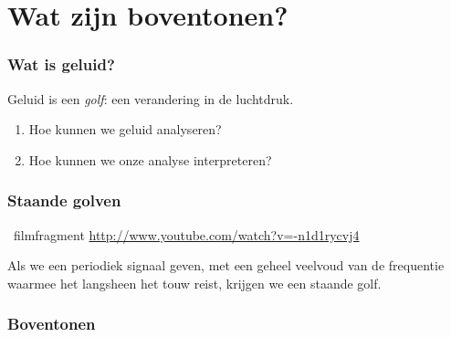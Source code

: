 \documentclass[compress, darktitle, framenumber, totalframenumber]{beamer}
\begin{document}
\section{Wat zijn boventonen?}

\begin{frame}
  \frametitle{Wat is geluid?}

  Geluid is een \emph{golf}: een verandering in de luchtdruk.
  \pause
  \begin{enumerate}
    \item Hoe kunnen we geluid analyseren?
    \item Hoe kunnen we onze analyse interpreteren?
  \end{enumerate}
\end{frame}

\begin{frame}
  \frametitle{Staande golven}

  \begin{block}{\Forward\ filmfragment}
    \url{http://www.youtube.com/watch?v=-n1d1rycvj4}
  \end{block}

  \pause

  Als we een periodiek signaal geven, met een geheel veelvoud van de frequentie waarmee het langsheen het touw reist, krijgen we een staande golf.
\end{frame}

\begin{frame}
  \frametitle{Boventonen}

  \centering
\end{frame}
\end{document}
